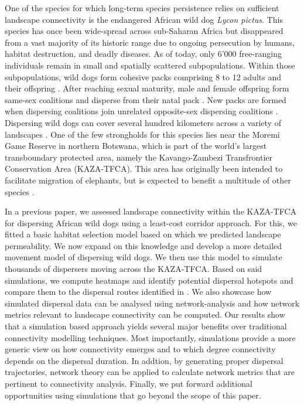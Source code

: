 \documentclass[abstract=on,10pt,a4paper,bibliography=totocnumbered]{article}
\begin{document}
One of the species for which long-term species persistence relies on sufficient
landscape connectivity is the endangered African wild dog \textit{Lycon pictus}.
This species has once been wide-spread across sub-Saharan Africa but disappeared
from a vast majority of its historic range due to ongoing persecution by humans,
habitat destruction, and deadly diseases. As of today, only 6'000 free-ranging
individuals remain in small and spatially scattered subpopulations. Within those
subpopulations, wild dogs form cohesive packs comprising 8 to 12 adults and
their offspring \cite{McNutt.1995}. After reaching sexual maturity, male and
female offspring form same-sex coalitions and disperse from their natal pack
\citep{McNutt.1996, Behr.2020}. New packs are formed when dispersing coalitions
join unrelated opposite-sex dispersing coalitions \citep{McNutt.1996}.
Dispersing wild dogs can cover several hundred kilometers across a variety of
landscapes \citep{DaviesMostert.2012, Masenga.2016, Cozzi.2020, Hofmann.2021}.
One of the few strongholds for this species lies near the Moremi Game Reserve in
northern Botswana, which is part of the world's largest transboundary protected
area, namely the Kavango-Zambezi Transfrontier Conservation Area (KAZA-TFCA).
This area has originally been intended to facilitate migration of elephants, but
is expected to benefit a multitude of other species \citep{Elliot.2014,
Brennan.2020, Hofmann.2021}.

In a previous paper, we assessed landscape connectivity within the KAZA-TFCA for
dispersing African wild dogs using a least-cost corridor approach. For this, we
fitted a basic habitat selection model based on which we predicted landscape
permeability. We now expand on this knowledge and develop a more detailed
movement model of dispersing wild dogs. We then use this model to simulate
thousands of dispersers moving across the KAZA-TFCA. Based on said simulations,
we compute heatmaps and identify potential dispersal hotspots and compare them
to the dispersal routes identified in \citep{Hofmann.2021}. We also showcase how
simulated dispersal data can be analysed using network-analysis and how network
metrics relevant to landscape connectivity can be computed. Our results show
that a simulation based approach yields several major benefits over traditional
connectivity modelling techniques. Most importantly, simulations provide a more
generic view on how connectivity emerges and to which degree connectivity
depends on the dispersal duration. In addtion, by generating proper dispersal
trajectories, network theory can be applied to calculate network metrics that
are pertinent to connectivity analysis. Finally, we put forward additional
opportunities using simulations that go beyond the scope of this paper.
\end{document}
